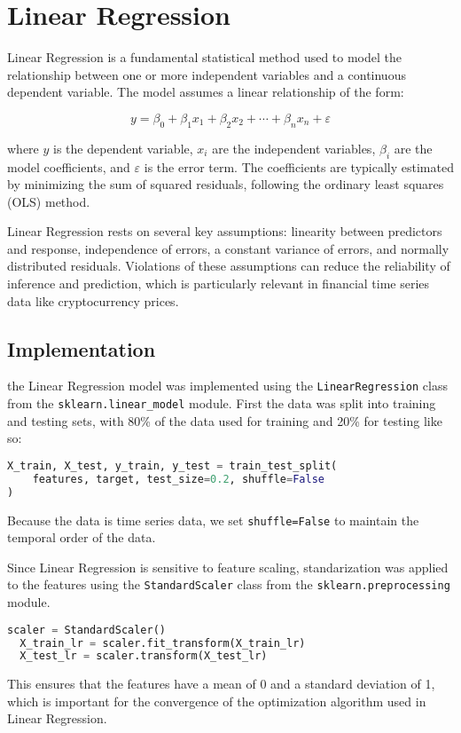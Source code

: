 \section{Linear Regression}
\label{sec:linearregression}
Linear Regression is a fundamental statistical method used to model the relationship between one or more independent variables and a continuous dependent variable. 
The model assumes a linear relationship of the form:

\[
y = \beta_0 + \beta_1 x_1 + \beta_2 x_2 + \cdots + \beta_n x_n + \varepsilon
\]

where \( y \) is the dependent variable, \( x_i \) are the independent variables, \( \beta_i \) are the model coefficients, and \( \varepsilon \) is the error term. 
The coefficients are typically estimated by minimizing the sum of squared residuals, following the ordinary least squares (OLS) method.

Linear Regression rests on several key assumptions: linearity between predictors and response, independence of errors, a constant variance of errors, and normally distributed residuals. Violations of these assumptions can reduce the reliability of inference and prediction, which is particularly relevant in financial time series data like cryptocurrency prices.

\subsection{Implementation}
\label{sec:linearregressionimplementation}
the Linear Regression model was implemented using the \texttt{LinearRegression} class from the \texttt{sklearn.linear\_model} module. 
First the data was split into training and testing sets, with 80\% of the data used for training and 20\% for testing like so:
\begin{lstlisting}[language=Python, caption={Splitting the data into training and testing sets}, label={lst:linearregression-split}]
  X_train, X_test, y_train, y_test = train_test_split(
    features, target, test_size=0.2, shuffle=False
)
\end{lstlisting}
Because the data is time series data, we set \texttt{shuffle=False} to maintain the temporal order of the data. 

Since Linear Regression is sensitive to feature scaling, standarization was applied to the features using the \texttt{StandardScaler} class from the \texttt{sklearn.preprocessing} module.
\begin{lstlisting}[language=Python, caption={Standardizing the features}, label={lst:linearregression-standardization}]
  scaler = StandardScaler()
  X_train_lr = scaler.fit_transform(X_train_lr)
  X_test_lr = scaler.transform(X_test_lr)
\end{lstlisting}
This ensures that the features have a mean of 0 and a standard deviation of 1, which is important for the convergence of the optimization algorithm used in Linear Regression.

